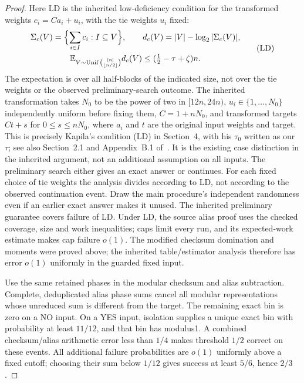 \documentclass[11pt]{article}
\theoremstyle{remark}\newtheorem*{remark}{Scope}
\begin{document}
\begin{proof}
Here LD is the inherited low-deficiency condition for the transformed
weights $c_i=Ca_i+u_i$, with the tie weights $u_i$ fixed:
\[
 \begin{gathered}
 \Sigma_c(V)=\Bigl\{\sum_{i\in I}c_i:I\subseteq V\Bigr\},\qquad
 d_c(V)=|V|-\log_2|\Sigma_c(V)|,\\
 \mathbb E_{V\sim\operatorname{Unif}\binom{[n]}{\lfloor n/2\rfloor}}
 d_c(V)\le(\tfrac12-\tau+\zeta)n.
 \end{gathered}\tag{LD}
\]
The expectation is over all half-blocks of the indicated size, not over
the tie weights or the observed preliminary-search outcome. The inherited
transformation takes $N_0$ to be the power of two in $[12n,24n)$,
$u_i\in\{1,\ldots,N_0\}$ independently uniform before fixing them,
$C=1+nN_0$, and transformed targets $Ct+s$ for $0\le s\le nN_0$,
where $a_i$ and $t$ are the original input weights and target.
This is precisely Kapila's condition (LD) in Section~4, with his $\tau_0$
written as our $\tau$; see also Section~2.1 and Appendix~B.1
of~\cite{kapila}. It is the existing case distinction in the inherited
argument, not an additional assumption on all inputs.
The preliminary search either gives an exact answer or continues.
For each fixed choice of tie weights the analysis divides according
to LD, not according to the observed continuation event. Draw the main
procedure's independent randomness even if an earlier exact answer
makes it unused. The inherited preliminary guarantee covers failure
of LD. Under LD, the source alias proof uses the checked coverage,
size and work inequalities; caps limit every run, and its expected-work
estimate makes cap failure $o(1)$. The modified checksum domination
and moments were proved above; the inherited table/estimator analysis
therefore has error $o(1)$ uniformly in the guarded fixed input.

Use the same retained phases in the modular checksum and alias
subtraction. Complete, deduplicated alias phase sums cancel all
modular representations whose unreduced sum is different from the
target. The remaining exact bin is zero on a NO input. On a YES input,
isolation supplies a unique exact bin with probability at least $11/12$,
and that bin has modulus1. A combined checksum/alias arithmetic error
less than $1/4$ makes threshold $1/2$ correct on these events.
All additional failure probabilities are $o(1)$ uniformly above a fixed
cutoff; choosing their sum below $1/12$ gives success at least $5/6$,
hence $2/3$.


\end{proof}
\end{document}
